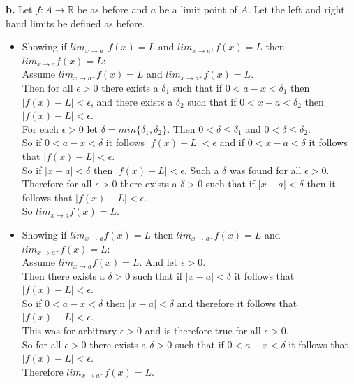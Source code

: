 \documentclass{article}
\begin{document}
{\Large \textbf{b.}} Let $f: A\rightarrow\mathbb{R}$ be as before and $a$ be a limit point of $A$. Let the left and right hand limits be defined as before.
\begin{center}
    \doublespacing
    \begin{itemize}
        \item Showing if $lim _{x\rightarrow a^{-}} f(x) = L$ and $lim _{x\rightarrow a^{+}} f(x) = L$ then $lim _{x\rightarrow a} f(x) = L$:
        \\Assume $lim _{x\rightarrow a^{-}} f(x) = L$ and $lim _{x\rightarrow a^{+}} f(x) = L$.
        \\Then for all $\epsilon > 0$ there exists a $\delta _1$ such that if $0 < a - x <\delta _1$ then $|f(x) - L| <\epsilon$, and there exists a $\delta _2$ such that if $0 < x - a <\delta _2$ then $|f(x) - L| <\epsilon$.
        \\For each $\epsilon > 0$ let $\delta = min\{\delta _1, \delta _2\}$. Then $0 <\delta\leq\delta _1$ and $0 <\delta\leq\delta _2$.
        \\So if $0 < a - x <\delta$ it follows $|f(x) - L| <\epsilon$ and if $0 < x - a <\delta$ it follows that $|f(x) - L| <\epsilon$.
        \\So if $|x - a| <\delta$ then $|f(x) - L| <\epsilon$. Such a $\delta$ was found for all $\epsilon > 0$.
        \\Therefore for all $\epsilon > 0$ there exists a $\delta > 0$ such that if $|x - a| <\delta$ then it follows that $|f(x) - L| <\epsilon$.
        \\So $lim _{x\rightarrow a} f(x) = L$.
        \item Showing if $lim _{x\rightarrow a} f(x) = L$ then $lim _{x\rightarrow a^{-}} f(x) = L$ and $lim _{x\rightarrow a^{+}} f(x) = L$:
        \\Assume $lim _{x\rightarrow a} f(x) = L$. And let $\epsilon > 0$.
        \\Then there exists a $\delta > 0$ such that if $|x - a| <\delta$ it follows that $|f(x) - L| <\epsilon$.
        \\So if $0 < a - x <\delta$ then $|x - a| <\delta$ and therefore it follows that $|f(x) - L| <\epsilon$.
        \\This was for arbitrary $\epsilon > 0$ and is therefore true for all $\epsilon > 0$.
        \\So for all $\epsilon > 0$ there exists a $\delta > 0$ such that if $0 < a - x <\delta$ it follows that $|f(x) - L| <\epsilon$.
        \\Therefore $lim _{x\rightarrow a^{-}} f(x) = L$.

\end{itemize}
\end{center}
\end{document}
